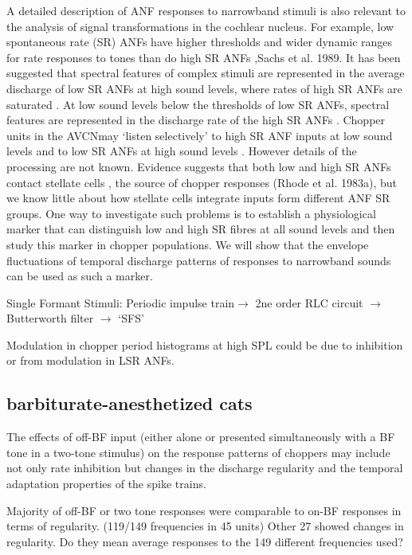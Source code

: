 \documentclass[10pt,a4paper]{article}
\begin{document}
A detailed description of ANF responses to narrowband stimuli is also relevant
to the analysis of signal transformations in the cochlear nucleus.  For example,
low spontaneous rate (SR) ANFs have higher thresholds and wider dynamic ranges
for rate responses to tones than do high SR ANFs \citep{Liberman:1978}{,Sachs et
  al. 1989}.  It has been suggested that spectral features of complex stimuli
are represented in the average discharge of low SR ANFs at high sound levels,
where rates of high SR ANFs are saturated
\citep{Delgutte:1982,WinslowBartaEtAl:1987}.  At low sound levels below the
thresholds of low SR ANFs, spectral features are represented in the discharge
rate of the high SR ANFs \citep{SachsYoung:1979}.  Chopper units in the AVCNmay
{\textquoteleft}listen selectively{\textquoteright} to high SR ANF inputs at low
sound levels and to low SR ANFs at high sound levels
\citep{BlackburnSachs:1990}.  However details of the processing are not known.
Evidence suggests that both low and high SR ANFs contact stellate cells
\citep{Liberman:1991,Ryugo:1992}, the source of chopper responses (Rhode et
al. 1983a), but we know little about how stellate cells integrate inputs form
different ANF SR groups.  One way to investigate such problems is to establish a
physiological marker that can distinguish low and high SR fibres at all sound
levels and then study this marker in chopper populations.  We will show that the
envelope fluctuations of temporal discharge patterns of responses to narrowband
sounds can be used as such a marker.


Single Formant Stimuli: Periodic impulse train\ensuremath{\rightarrow} 2ne order
RLC circuit \ensuremath{\rightarrow} Butterworth filter \ensuremath{\rightarrow}
{\textquoteleft}SFS{\textquoteright}

Modulation in chopper period histograms at high SPL could be due to inhibition
or from modulation in LSR ANFs.

\subsection{\citep{BlackburnSachs:1992} barbiturate-anesthetized cats}

The effects of off-BF input (either alone or presented simultaneously with a BF
tone in a two-tone stimulus) on the response patterns of choppers may include
not only rate inhibition but changes in the discharge regularity and the
temporal adaptation properties of the spike trains.

Majority of off-BF or two tone responses were comparable to on-BF responses in
terms of regularity. (119/149 frequencies in 45 units) Other 27 showed changes
in regularity. Do they mean average responses to the 149 different frequencies
used?
\end{document}
